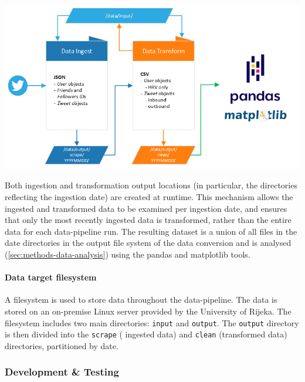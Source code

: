 \begin{center}
\includegraphics[width=14cm,keepaspectratio]{images/twitter-data-platform.png}
\label{figure:twitter-data-platform-design}
\end{center}

Both ingestion and transformation output locations (in particular, the directories reflecting the ingestion date) are created at runtime. This mechanism allows the ingested and transformed data to be examined per ingestion date, and ensures that only the most recently ingested data is transformed, rather than the entire data for each \gls{data-pipeline} run. The resulting dataset is a union of all files in the date directories in the output file system of the data conversion and is analysed (\ref{sec:methods-data-analysis}) using the \gls{pandas} and \gls{matplotlib} tools.

\paragraph{Data target filesystem} A filesystem is used to store data throughout the \gls{data-pipeline}. The data is stored on an on-premise Linux server provided by the University of Rijeka. The filesystem includes two main directories: \texttt{input} and \texttt{output}. The \texttt{output} directory is then divided into the \texttt{scrape} ( ingested data) and \texttt{clean} (transformed data) directories, partitioned by date.


\vspace{1.2cm}
\subsubsection{Development \& Testing}
\label{subsec:sdlc-development}

